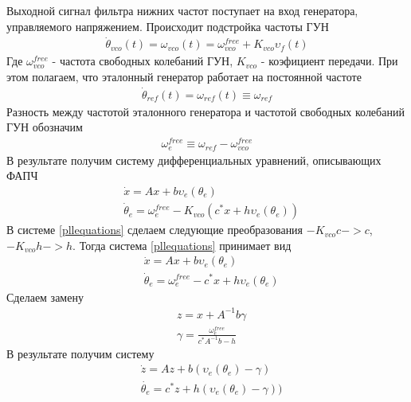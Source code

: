 \documentclass[a4paper,14pt]{extarticle} %
\begin{document}
Выходной сигнал фильтра нижних частот поступает на вход генератора, управляемого напряжением. Происходит подстройка частоты ГУН
 \begin{equation*}
 \begin{aligned}
\dot{\theta}_{vco}(t) = \omega_{vco}(t) = \omega^{free}_{vco} + K_{vco}\upsilon_f(t)
 \end{aligned}
\end{equation*}
Где $\omega^{free}_{vco}$ - частота свободных колебаний ГУН, $K_{vco}$ - коэфициент передачи. При этом полагаем, что эталонный генератор работает на постоянной частоте
 \begin{equation*}
 \begin{aligned}
\dot{\theta}_{ref}(t) = \omega_{ref}(t) \equiv \omega_{ref}
 \end{aligned}
\end{equation*}
Разность между частотой эталонного генератора и частотой свободных колебаний ГУН обозначим
 \begin{equation*}
 \begin{aligned}
\omega_e^{free} \equiv \omega_{ref} - \omega^{free}_{vco}
 \end{aligned}
\end{equation*}
В результате получим систему дифференциальных уравнений, описывающих ФАПЧ
 \begin{equation}\label{pllequations}
 \begin{aligned}
 &\dot{x} = Ax + b\upsilon_e(\theta_e)\\
 &\dot{\theta}_e = \omega_e^{free} - K_{vco}(c^*x + h\upsilon_e(\theta_e))
 \end{aligned}
\end{equation}
В системе \eqref{pllequations} сделаем следующие преобразования $-K_{vco}c -> c$, $-K_{vco}h -> h$. Тогда система \eqref{pllequations} принимает вид
 \begin{equation}
 \begin{aligned}
 &\dot{x} = Ax + b\upsilon_e(\theta_e)\\
 &\dot{\theta}_e = \omega_e^{free} - c^*x + h\upsilon_e(\theta_e)
 \end{aligned}
\end{equation}
Сделаем замену
 \begin{equation}
 \begin{aligned}
 &z = x + A^{-1}b\gamma \\
 &\gamma = \frac{\omega_e^{free}}{c^*A^{-1}b-h}
 \end{aligned}
\end{equation}
В результате получим систему
 \begin{equation}\label{system}
 \begin{aligned}
 &\dot{z} = Az + b(\upsilon_e(\theta_e) - \gamma)\\
 &\dot{\theta_e} = c^*z + h(\upsilon_e(\theta_e) - \gamma))
 \end{aligned}
\end{equation}
\end{document}

